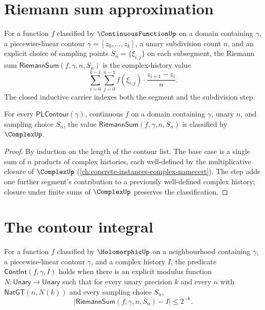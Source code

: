 \section{Riemann sum approximation}

\begin{definition}
\label{def:riemann-sum}
For a function \(f\) classified by \(\ContinuousFunctionUp\) on a domain containing \(\gamma\), a piecewise-linear contour \(\gamma = [z_0, \ldots, z_k]\), a unary subdivision count \(n\), and an explicit choice of sampling points \(S_n = \{\xi_{i,j}\}\) on each subsegment, the Riemann sum \(\mathsf{RiemannSum}(f, \gamma, n, S_n)\) is the complex-history value
$$
\sum_{i=0}^{k-1} \sum_{j=0}^{n-1} f(\xi_{i,j}) \cdot \frac{z_{i+1} - z_i}{n}.
$$
The closed inductive carrier indexes both the segment and the subdivision step.
\end{definition}

\begin{lemma}
\label{lem:riemann-sum-complex}
For every \(\mathsf{PLContour}(\gamma)\), continuous \(f\) on a domain containing \(\gamma\), unary \(n\), and sampling choice \(S_n\), the value \(\mathsf{RiemannSum}(f, \gamma, n, S_n)\) is classified by \(\ComplexUp\).
\end{lemma}
\begin{proof}
By induction on the length of the contour list. The base case is a single sum of \(n\) products of complex histories, each well-defined by the multiplicative closure of \(\ComplexUp\) (\autoref{ch:concrete-instances-complex-namecert}). The step adds one further segment's contribution to a previously well-defined complex history; closure under finite sums of \(\ComplexUp\) preserves the classification.
\end{proof}

\section{The contour integral}

\begin{definition}
\label{def:cont-int}
For a function \(f\) classified by \(\HolomorphicUp\) on a neighbourhood containing \(\gamma\), a piecewise-linear contour \(\gamma\), and a complex history \(I\), the predicate \(\mathsf{ContInt}(f, \gamma, I)\) holds when there is an explicit modulus function \(N : \mathsf{Unary} \to \mathsf{Unary}\) such that for every unary precision \(k\) and every \(n\) with \(\mathsf{NatGT}(n, N(k))\) and every sampling choice \(S_n\),
$$
\bigl| \mathsf{RiemannSum}(f, \gamma, n, S_n) - I \bigr| \leq 2^{-k}.
$$
\end{definition}

